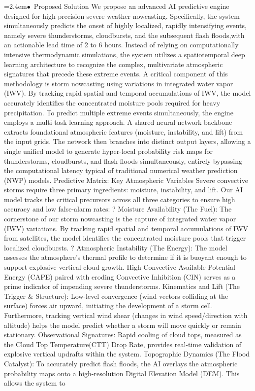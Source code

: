 \documentclass[10pt,a4paper]{article}
\begin{document}
\begin{tcolorbox}[pscard, title={"\textbf{SIH26077} \quad $\vert$ \quad AI-Driven Hyper-Local Early Warning System for Severe Weather Nowcasting}]
\noindent\hspace*{1.2em}\hangindent=2.4em\textcolor{sihblue}{$\bullet$}~\small Proposed Solution We propose an advanced AI predictive engine designed for high-precision severe-weather nowcasting. Specifically, the system simultaneously predicts the onset of highly localized, rapidly intensifying events, namely severe thunderstorms, cloudbursts, and the subsequent flash floods,with an actionable lead time of 2 to 6 hours. Instead of relying on computationally intensive thermodynamic simulations, the system utilizes a spatiotemporal deep learning architecture to recognize the complex, multivariate atmospheric signatures that precede these extreme events. A critical component of this methodology is storm nowcasting using variations in integrated water vapor (IWV). By tracking rapid spatial and temporal accumulations of IWV, the model accurately identifies the concentrated moisture pools required for heavy precipitation. To predict multiple extreme events simultaneously, the engine employs a multi-task learning approach. A shared neural network backbone extracts foundational atmospheric features (moisture, instability, and lift) from the input grids. The network then branches into distinct output layers, allowing a single unified model to generate hyper-local probability risk maps for thunderstorms, cloudbursts, and flash floods simultaneously, entirely bypassing the computational latency typical of traditional numerical weather prediction (NWP) models. Predictive Matrix: Key Atmospheric Variables Severe convective storms require three primary ingredients: moisture, instability, and lift. Our AI model tracks the critical precursors across all three categories to ensure high accuracy and low false-alarm rates: ? Moisture Availability (The Fuel): The cornerstone of our storm nowcasting is the capture of integrated water vapor (IWV) variations. By tracking rapid spatial and temporal accumulations of IWV from satellites, the model identifies the concentrated moisture pools that trigger localized cloudbursts. ? Atmospheric Instability (The Energy): The model assesses the atmosphere's thermal profile to determine if it is buoyant enough to support explosive vertical cloud growth. High Convective Available Potential Energy (CAPE) paired with eroding Convective Inhibition (CIN) serves as a prime indicator of impending severe thunderstorms. Kinematics and Lift (The Trigger \& Structure): Low-level convergence (wind vectors colliding at the surface) forces air upward, initiating the development of a storm cell. Furthermore, tracking vertical wind shear (changes in wind speed/direction with altitude) helps the model predict whether a storm will move quickly or remain stationary. Observational Signatures: Rapid cooling of cloud tops, measured as the Cloud Top Temperature(CTT) Drop Rate, provides real-time validation of explosive vertical updrafts within the system. Topographic Dynamics (The Flood Catalyst): To accurately predict flash floods, the AI overlays the atmospheric probability maps onto a high-resolution Digital Elevation Model (DEM). This allows the system to 
\end{tcolorbox}
\end{document}
